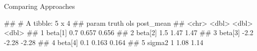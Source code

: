 \documentclass[11pt,ignorenonframetext,]{beamer}
\newenvironment{Shaded}{}{}
\newcommand{\DataTypeTok}[1]{\textcolor[rgb]{0.56,0.13,0.00}{#1}}
\newcommand{\DecValTok}[1]{\textcolor[rgb]{0.25,0.63,0.44}{#1}}
\newcommand{\FloatTok}[1]{\textcolor[rgb]{0.25,0.63,0.44}{#1}}
\newcommand{\KeywordTok}[1]{\textcolor[rgb]{0.00,0.44,0.13}{\textbf{#1}}}
\newcommand{\NormalTok}[1]{#1}
\newcommand{\OperatorTok}[1]{\textcolor[rgb]{0.40,0.40,0.40}{#1}}
\newcommand{\StringTok}[1]{\textcolor[rgb]{0.25,0.44,0.63}{#1}}
\let\oldShaded\Shaded
\let\endoldShaded\endShaded
\renewenvironment{Shaded}{\footnotesize\begin{spacing}{0.9}\oldShaded}{\endoldShaded\end{spacing}}
\let\oldverbatim\verbatim
\let\endoldverbatim\endverbatim
\renewenvironment{verbatim}{\footnotesize\begin{spacing}{0.9}\oldverbatim}{\endoldverbatim\end{spacing}}
\begin{document}
\begin{frame}[fragile]{Comparing Approaches}
\protect\hypertarget{comparing-approaches}{}

\scriptsize

\begin{Shaded}
\end{Shaded}

\begin{verbatim}
## # A tibble: 5 x 4
##   param   truth    ols post_mean
##   <chr>   <dbl>  <dbl>     <dbl>
## 1 beta[1]   0.7  0.657     0.656
## 2 beta[2]   1.5  1.47      1.47 
## 3 beta[3]  -2.2 -2.28     -2.28 
## 4 beta[4]   0.1  0.163     0.164
## 5 sigma2    1    1.08      1.14
\end{verbatim}

\end{frame}
\end{document}
